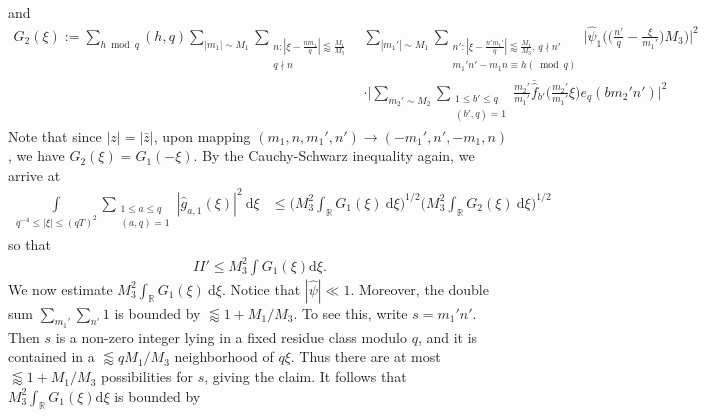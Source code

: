 \documentclass[12pt]{amsart}
\theoremstyle{definition}
\theoremstyle{plain}
\theoremstyle{remark}
\numberwithin{equation}{section}
\numberwithin{theorem}{section}
\numberwithin{equation}{section}
\begin{document}
	and 
	\begin{align*}
		G_2(\xi):= \sum_{h \bmod q}(h, q)
		\sum_{|m_{1}|\sim M_{1}}\sum_{\substack{n: |\xi - \frac{nm_{1}}{q}|\lessapprox \frac{M_{1}}{M_{3}} \\ q\nmid n }}
		&\sum_{|m_{1}'|\sim M_{1}}
		\sum_{\substack{n': |\xi - \frac{n'm_{1}'}{q}|\lessapprox \frac{M_{1}}{M_{3}}, \, q\nmid n' \\  m_{1}'n'-m_{1}n\equiv h (\!\bmod q) }}\bigg|\hat{\psi}_{1}\bigg(\bigg(\frac{n'}{q}-\frac{\xi}{m_{1}'}\bigg)M_{3}\bigg)\bigg|^{2}
		\\
		&\cdot\Biggl|\sum_{m_{2}'\sim M_{2}}
		\sum_{\substack{1 \leq b' \leq q \\ (b', q)=1}}\frac{m_{2}'}{m_{1}'}\overline{\hat{f}}_{b'}\bigg(\frac{m_{2}'}{m_{1}'}\xi\bigg)
		e_q({bm_{2}'n'})\Biggl|^{2}
	\end{align*}
	Note that since $|z|=|\bar{z}|$, upon mapping $(m_1,n,m_1',n') \to (-m_1',n',-m_1,n)$, we have $G_2(\xi)= G_1(-\xi)$. By the Cauchy-Schwarz inequality again, we arrive at
	\begin{align*}
		\int\limits_{q^{-4} \leq |\xi| \leq (qT)^2}\sum_{\substack{1 \leq a \leq q \\ (a, q)=1}}|\hat{g}_{a,1}(\xi)|^{2}\: \mathrm{d} \xi &\leq \bigg(M_{3}^{2}\int_{\mathbb{R}}G_{1}(\xi)\: \mathrm{d} \xi\bigg)^{1/2}\bigg(M_{3}^{2}\int_{\mathbb{R}}G_{2}(\xi)\: \mathrm{d} \xi\bigg)^{1/2}
	\end{align*}
	so that
	\begin{align}\label{causII'}
		II' \leq M_3^2 \int G_1(\xi) \mathrm{d} \xi.
	\end{align}
	We now estimate $M_{3}^{2}\int_{\mathbb{R}}G_{1}(\xi)\: \mathrm{d} \xi$. Notice that $|\hat{\psi}|\ll 1$. Moreover, the double sum
	$\sum_{m_1'}\sum_{n'}1$ is bounded by $\lessapprox 1+M_1/M_3$.
	To see this, write $s=m_1'n'$. Then $s$ is a non-zero integer lying in a fixed
	residue class modulo $q$, and it is contained in a $\lessapprox qM_1/M_3$
	neighborhood of $q\xi$. Thus there are at most $\lessapprox 1+M_1/M_3$
	possibilities for $s$, giving the claim. It follows that $M_3^2 \int_{\mathbb{R}}G_1(\xi) \mathrm{d} \xi$ is bounded by 
	\label{exprintG}
\end{document}
